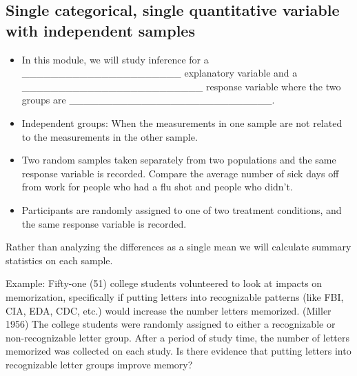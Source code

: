 \documentclass[
]{report}
\begin{document}

\subsection*{Single categorical, single quantitative variable with independent samples}\label{single-categorical-single-quantitative-variable-with-independent-samples}


\begin{itemize}
\item
  In this module, we will study inference for a \_\_\_\_\_\_\_\_\_\_\_\_\_\_\_\_\_\_\_\_\_\_ explanatory variable and a \_\_\_\_\_\_\_\_\_\_\_\_\_\_\_\_\_\_\_\_\_\_\_\_\_ response variable where the two groups are \_\_\_\_\_\_\_\_\_\_\_\_\_\_\_\_\_\_\_\_\_\_\_\_\_\_\_\_.
\item
  Independent groups: When the measurements in one sample are not
  related to the measurements in the other sample.
\end{itemize}


\begin{itemize}
\item
  Two random samples taken separately from two populations and the same response variable is recorded. Compare the average number of sick days off from work for people who had a flu shot and people who didn't.
\item
  Participants are randomly assigned to one of two treatment conditions, and the same response variable is recorded.
\end{itemize}

Rather than analyzing the differences as a single mean we will calculate summary statistics on each sample.

Example: Fifty-one (51) college students volunteered to look at impacts on memorization, specifically if putting letters into recognizable patterns (like FBI, CIA, EDA, CDC, etc.) would increase the number letters memorized. (Miller 1956) The college students were randomly assigned to either a recognizable or non-recognizable letter group. After a period of study time, the number of letters memorized was collected on each study. Is there evidence that putting letters into recognizable letter groups improve memory?

\end{document}
